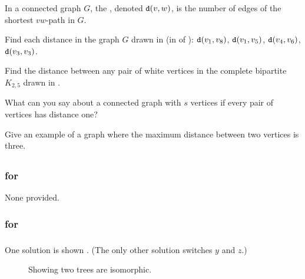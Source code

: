 \begin{exer}[\exerE] %
\label{exer_distance_graph}
    In a connected graph $G$, the , denoted $\texttt{d}(v,w)$, is the number of edges of the shortest $vw$-path in $G$.
    \begin{apart}
        \item Find each distance in the graph $G$ drawn in  (in  of ): $\texttt{d}(v_1,v_8)$, $\texttt{d}(v_1,v_5)$, $\texttt{d}(v_4,v_6)$, $\texttt{d}(v_3,v_3)$.
        \item Find the distance between any pair of white vertices in the complete bipartite $K_{2,5}$ drawn in .
        \item What can you say about a connected graph with $s$ vertices if every pair of vertices has distance one?
        \item Give an example of a graph where the maximum distance between two vertices is three.
      \end{apart}
\end{exer}

\subsection{\answers}

\subsubsection{\answers for  \subplanarity}

None provided.


\subsubsection{\answers for  \subisograph}

\subsubsection*{ \answers}
    One solution is shown . (The only other solution switches $y$ and $z$.)

        \begin{figure}[hbtp]
            \centering
            
            \caption{Showing two trees are isomorphic.}
            \label{fig_ism_trees_easy_answer}
        \end{figure}

